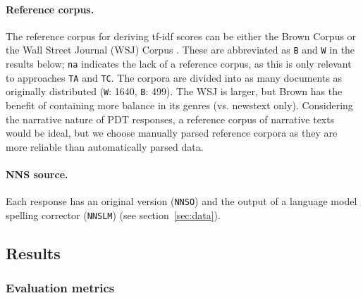 \documentclass[11pt,letterpaper]{article}
\newcommand{\param}[1]{\texttt{#1}}
\newcommand{\md}[1]{\marginpar{\scriptsize MD: #1}}
\renewcommand{\marginpar}[1]{}
\begin{document}
\paragraph{Reference corpus.} The reference corpus for deriving tf-idf
scores can be either the Brown Corpus \citep{kucera:francis:67} or the
Wall Street Journal (WSJ) Corpus \citep{marcus-et-al:93}. These are
abbreviated as \param{B} and \param{W} in the results
below; \param{na} indicates the lack of a reference corpus, as this is
only relevant to approaches \param{TA} and
\param{TC}. The corpora are divided into as many documents as
originally distributed (\param{W}: 1640, \param{B}: 499). The WSJ is
larger, but Brown has the benefit of containing more balance in its
genres (vs. newstext only). Considering the narrative nature of PDT
responses, a reference corpus of narrative texts would be ideal, but
we choose manually parsed reference corpora as they are more reliable
than automatically parsed data.


\paragraph{NNS source.} Each response has an original version
(\param{NNSO}) and the output of a language model spelling corrector
(\param{NNSLM}) (see section~\ref{sec:data}).

\subsection{Results}

\subsubsection{Evaluation metrics}
\label{sec:metrics}
\end{document}
